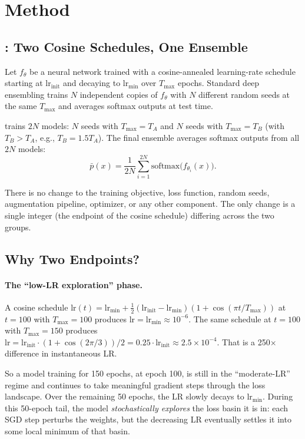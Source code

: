 \section{Method}
\label{sec:method}

\subsection{\ours{}: Two Cosine Schedules, One Ensemble}

Let $f_\theta$ be a neural network trained with a cosine-annealed
learning-rate schedule~\cite{loshchilov2017sgdr} starting at
$\mathrm{lr}_{\mathrm{init}}$ and decaying to $\mathrm{lr}_{\mathrm{min}}$
over $T_\mathrm{max}$ epochs.
Standard deep ensembling trains $N$ independent copies of $f_\theta$ with
$N$ different random seeds at the same $T_\mathrm{max}$ and averages softmax
outputs at test time.

\ours{} trains $2N$ models: $N$ seeds with $T_\mathrm{max}=T_A$ and $N$
seeds with $T_\mathrm{max}=T_B$ (with $T_B > T_A$, e.g., $T_B = 1.5 T_A$).
The final ensemble averages softmax outputs from all $2N$ models:
\[
\bar p(x) = \frac{1}{2N}\sum_{i=1}^{2N} \mathrm{softmax}\!\bigl(f_{\theta_i}(x)\bigr).
\]

There is no change to the training objective, loss function, random seeds,
augmentation pipeline, optimizer, or any other component. The only change
is a single integer (the endpoint of the cosine schedule) differing across
the two groups.

\subsection{Why Two Endpoints?}

\paragraph{The ``low-LR exploration'' phase.}
A cosine schedule $\mathrm{lr}(t) = \mathrm{lr}_{\mathrm{min}} +
\frac{1}{2}(\mathrm{lr}_{\mathrm{init}} - \mathrm{lr}_{\mathrm{min}})(1 + \cos(\pi t / T_{\max}))$
at $t=100$ with $T_\mathrm{max}=100$ produces
$\mathrm{lr}=\mathrm{lr}_{\mathrm{min}} \approx 10^{-6}$. The same schedule at
$t=100$ with $T_\mathrm{max}=150$ produces
$\mathrm{lr} = \mathrm{lr}_{\mathrm{init}} \cdot (1 + \cos(2\pi/3))/2 = 0.25 \cdot \mathrm{lr}_{\mathrm{init}} \approx 2.5 \times 10^{-4}$.
That is a 250$\times$ difference in instantaneous LR.

So a model training for 150 epochs, at epoch 100, is still in the
``moderate-LR'' regime and continues to take meaningful gradient steps
through the loss landscape. Over the remaining 50 epochs, the LR slowly
decays to $\mathrm{lr}_{\mathrm{min}}$. During this 50-epoch tail, the
model \emph{stochastically explores} the loss basin it is in: each SGD
step perturbs the weights, but the decreasing LR eventually settles it
into some local minimum of that basin.

